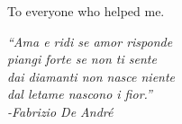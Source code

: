 \documentclass[10pt, a4paper, twoside, onpenany]{report}
\begin{document}
	To everyone who helped me.
	\vspace*{2.0cm}
	\begin{flushright}
		\textit{“Ama e ridi se amor risponde\\piangi forte se non ti sente\\dai diamanti non nasce niente\\dal letame nascono i fior.”\\-Fabrizio De André}
	\end{flushright}

	
	
	\tableofcontents
		
	
	
	
	
	
	
	
	
	
	
	
	
	
	
	
	
\end{document}
